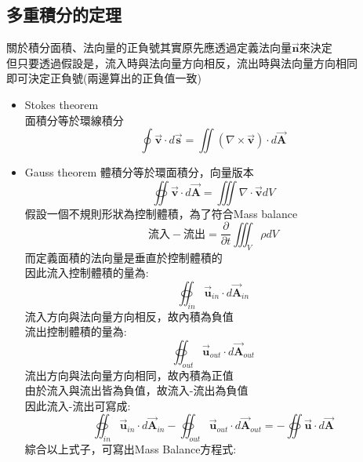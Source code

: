 \documentclass[../main.tex]{subfiles}
\begin{document}
\subsection{多重積分的定理}
關於積分面積、法向量的正負號其實原先應透過定義法向量$\vec {\bm n}$來決定\\
但只要透過假設是，流入時與法向量方向相反，流出時與法向量方向相同\\
即可決定正負號(兩邊算出的正負值一致)
\begin{itemize}
  \item Stokes theorem\\
    面積分等於環線積分
    \begin{equation}
      \oint \vec {\bm v} \cdot d\vec {\bm s} = \iint \left(\nabla \times \vec {\bm v}\right) \cdot d\vec {\bm A}
    \end{equation}
    \item Gauss theorem
    體積分等於環面積分，向量版本
    \begin{equation}
      \oiint \vec {\bm v} \cdot d\vec {\bm A} = \iiint \nabla \cdot \vec {\bm v} dV
    \end{equation}
    假設一個不規則形狀為控制體積，為了符合Mass balance
    \begin{equation}
      \text{流入} - \text{流出} = \frac{\partial }{\partial t} \iiint_{V} \rho dV
    \end{equation}
    而定義面積的法向量是垂直於控制體積的\\
    因此流入控制體積的量為:
    \begin{equation}
      \oiint_{in} \vec {\bm u}_{in} \cdot d\vec {\bm A}_{in} 
    \end{equation}
    流入方向與法向量方向相反，故內積為負值\\
    流出控制體積的量為:
    \begin{equation}
      \oiint_{out} \vec {\bm u}_{out} \cdot d\vec {\bm A}_{out} 
    \end{equation}
    流出方向與法向量方向相同，故內積為正值\\
    由於流入與流出皆為負值，故流入-流出為負值\\
    因此流入-流出可寫成:
    \begin{equation}
      \oiint_{in} \vec {\bm u}_{in} \cdot d\vec {\bm A}_{in} - \oiint_{out} \vec {\bm u}_{out} \cdot d\vec {\bm A}_{out} = -\oiint \vec {\bm u} \cdot d\vec {\bm A}
    \end{equation}
    綜合以上式子，可寫出Mass Balance方程式:
    \begin{equation}

\end{equation}
\end{itemize}
\end{document}
